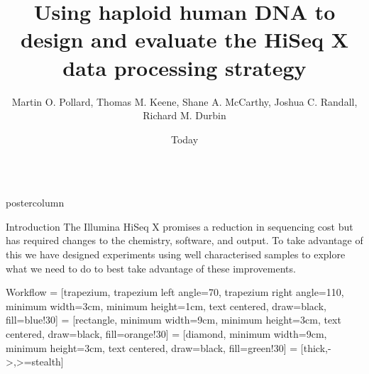 \documentclass[final]{beamer}
\title{Using haploid human DNA to design and evaluate the HiSeq X data processing strategy}
\author{Martin O. Pollard, Thomas M. Keene, Shane A. McCarthy, Joshua C. Randall, Richard M. Durbin}
\institute[Wellcome Trust Sanger Institute]{Wellcome Trust Sanger Institute}
\date{Today}
\begin{document}
\begin{frame}{}
    \begin{columns}
    \begin{column}{.49\textwidth}
        \begin{beamercolorbox}[center,wd=\textwidth]{postercolumn}
            \begin{minipage}[T]{.95\textwidth}  %
            \begin{block}{Introduction}
            The Illumina HiSeq X promises a reduction in sequencing cost but has required changes to the chemistry, software, and output.  To take advantage of this we have designed experiments using well characterised samples to explore what we need to do to best take advantage of these improvements. 
            \end{block}
            \begin{block}{Workflow}
                 = [trapezium, trapezium left angle=70, trapezium right angle=110, minimum width=3cm, minimum height=1cm, text centered, draw=black, fill=blue!30]
                 = [rectangle, minimum width=9cm, minimum height=3cm, text centered, draw=black, fill=orange!30]
                 = [diamond, minimum width=9cm, minimum height=3cm, text centered, draw=black, fill=green!30]
                 = [thick,->,>=stealth]
                \centering
\end{block}
\end{minipage}
\end{beamercolorbox}
\end{column}
\end{columns}
\end{frame}
\end{document}
